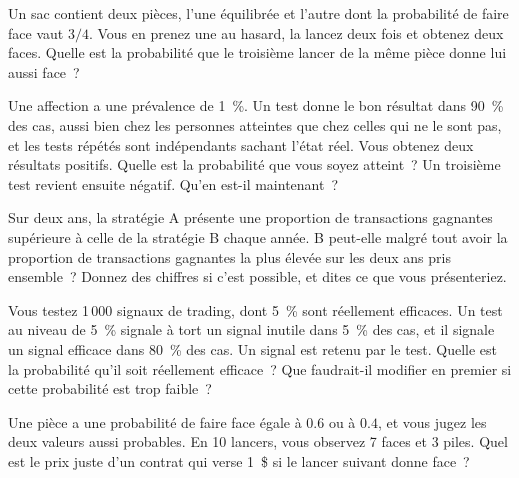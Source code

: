 \begin{question}\label{iq:iv1:conditional-probability-and-bayes:13}
Un sac contient deux pièces, l'une équilibrée et l'autre dont la probabilité de faire face vaut $3/4$. Vous en prenez une au hasard, la lancez deux fois et obtenez deux faces. Quelle est la probabilité que le troisième lancer de la même pièce donne lui aussi face~?
\end{question}

\begin{question}\label{iq:iv1:conditional-probability-and-bayes:14}
Une affection a une prévalence de 1~\%. Un test donne le bon résultat dans 90~\% des cas, aussi bien chez les personnes atteintes que chez celles qui ne le sont pas, et les tests répétés sont indépendants sachant l'état réel. Vous obtenez deux résultats positifs. Quelle est la probabilité que vous soyez atteint~? Un troisième test revient ensuite négatif. Qu'en est-il maintenant~?
\end{question}

\begin{question}\label{iq:iv1:conditional-probability-and-bayes:15}
Sur deux ans, la stratégie A présente une proportion de transactions gagnantes supérieure à celle de la stratégie B chaque année. B peut-elle malgré tout avoir la proportion de transactions gagnantes la plus élevée sur les deux ans pris ensemble~? Donnez des chiffres si c'est possible, et dites ce que vous présenteriez.
\end{question}

\begin{question}\label{iq:iv1:conditional-probability-and-bayes:16}
Vous testez 1\,000 signaux de trading, dont 5~\% sont réellement efficaces. Un test au niveau de 5~\% signale à tort un signal inutile dans 5~\% des cas, et il signale un signal efficace dans 80~\% des cas. Un signal est retenu par le test. Quelle est la probabilité qu'il soit réellement efficace~? Que faudrait-il modifier en premier si cette probabilité est trop faible~?
\end{question}

\begin{question}\label{iq:iv1:conditional-probability-and-bayes:17}
Une pièce a une probabilité de faire face égale à $0.6$ ou à $0.4$, et vous jugez les deux valeurs aussi probables. En 10 lancers, vous observez 7 faces et 3 piles. Quel est le prix juste d'un contrat qui verse 1~\$ si le lancer suivant donne face~?
\end{question}

